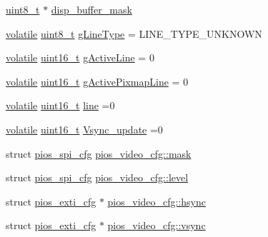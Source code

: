 \begin{DoxyCompactItemize}
\item 
\hyperlink{stdint_8h_aba7bc1797add20fe3efdf37ced1182c5}{uint8\-\_\-t} $\ast$ \hyperlink{group___p_i_o_s___v_i_d_e_o_ga2de64a6d3102b302a9b7582d63f09485}{disp\-\_\-buffer\-\_\-mask}
\item 
\hyperlink{group___c_m_s_i_s___core___instruction_interface_gad7d93af13046b0378601b85c8c16673b}{volatile} \hyperlink{stdint_8h_aba7bc1797add20fe3efdf37ced1182c5}{uint8\-\_\-t} \hyperlink{group___p_i_o_s___v_i_d_e_o_ga2be6bb035ef820488def868f5165b836}{g\-Line\-Type} = L\-I\-N\-E\-\_\-\-T\-Y\-P\-E\-\_\-\-U\-N\-K\-N\-O\-W\-N
\item 
\hyperlink{group___c_m_s_i_s___core___instruction_interface_gad7d93af13046b0378601b85c8c16673b}{volatile} \hyperlink{stdint_8h_a273cf69d639a59973b6019625df33e30}{uint16\-\_\-t} \hyperlink{group___p_i_o_s___v_i_d_e_o_ga2b82b203be6721e41653a0b4c07bfd82}{g\-Active\-Line} = 0
\item 
\hyperlink{group___c_m_s_i_s___core___instruction_interface_gad7d93af13046b0378601b85c8c16673b}{volatile} \hyperlink{stdint_8h_a273cf69d639a59973b6019625df33e30}{uint16\-\_\-t} \hyperlink{group___p_i_o_s___v_i_d_e_o_ga4e778b3bd5c9d692c381957e741aa4a3}{g\-Active\-Pixmap\-Line} = 0
\item 
\hyperlink{group___c_m_s_i_s___core___instruction_interface_gad7d93af13046b0378601b85c8c16673b}{volatile} \hyperlink{stdint_8h_a273cf69d639a59973b6019625df33e30}{uint16\-\_\-t} \hyperlink{group___p_i_o_s___v_i_d_e_o_ga308d53a9c395c298132110da98adb7c7}{line} =0
\item 
\hyperlink{group___c_m_s_i_s___core___instruction_interface_gad7d93af13046b0378601b85c8c16673b}{volatile} \hyperlink{stdint_8h_a273cf69d639a59973b6019625df33e30}{uint16\-\_\-t} \hyperlink{group___p_i_o_s___v_i_d_e_o_ga650b4db295bf40320fafbfce5954a39e}{Vsync\-\_\-update} =0
\item 
struct \hyperlink{structpios__spi__cfg}{pios\-\_\-spi\-\_\-cfg} \hyperlink{group___p_i_o_s___v_i_d_e_o_gac6699e31fbc588e69db444000ba7d44d}{pios\-\_\-video\-\_\-cfg\-::mask}
\item 
struct \hyperlink{structpios__spi__cfg}{pios\-\_\-spi\-\_\-cfg} \hyperlink{group___p_i_o_s___v_i_d_e_o_gab3de6ddfa1d478f8062c895cad5d4793}{pios\-\_\-video\-\_\-cfg\-::level}
\item 
struct \hyperlink{structpios__exti__cfg}{pios\-\_\-exti\-\_\-cfg} $\ast$ \hyperlink{group___p_i_o_s___v_i_d_e_o_ga01589e94ad18d5c8d12f72778539f8aa}{pios\-\_\-video\-\_\-cfg\-::hsync}
\item 
struct \hyperlink{structpios__exti__cfg}{pios\-\_\-exti\-\_\-cfg} $\ast$ \hyperlink{group___p_i_o_s___v_i_d_e_o_ga489c20025b1facf5435c66ff616e1cd9}{pios\-\_\-video\-\_\-cfg\-::vsync}

\end{DoxyCompactItemize}
